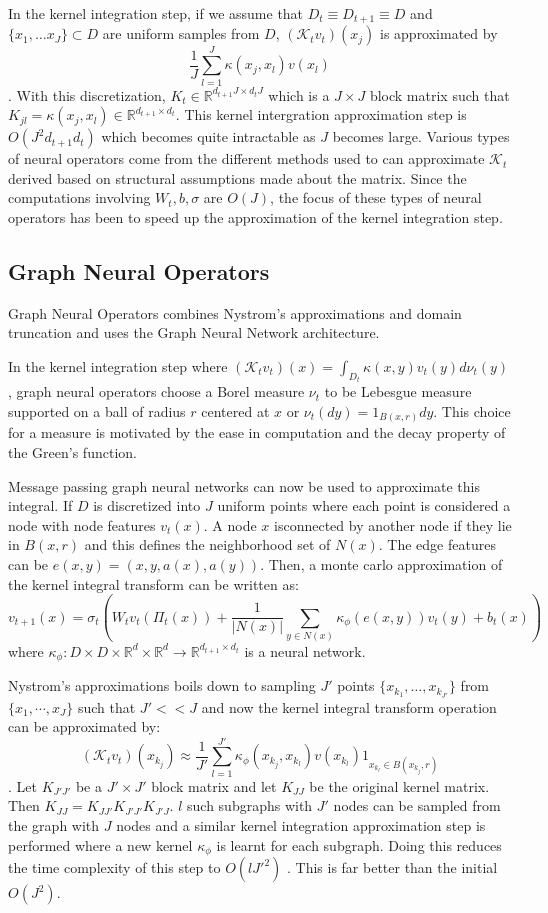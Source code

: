 \documentclass[12pt]{article}
\begin{document}
In the kernel integration step, if we assume that $ D_t \equiv D_{t + 1} \equiv D$ and $\{x_1, \dots x_J\} \subset D$ are uniform samples from $D$, $(\mathcal{K}_tv_t)(x_j)$ is approximated by
$$\frac{1}{J}\sum_{l = 1}^J \kappa(x_j, x_l)v(x_l)$$. With this discretization, $K_t \in \mathbb{R}^{d_{t + 1}J \times d_{t}J}$ which is a $J \times J$ block matrix such that $K_{jl} = \kappa(x_j, x_l) \in \mathbb{R}^{d_{t + 1} \times d_t}$. This kernel intergration approximation step is $O(J^2d_{t + 1}d_t)$ which becomes quite intractable as $J$ becomes large. Various types of neural operators come from the different methods used to can approximate $\mathcal{K}_t$ derived based on structural assumptions made about the matrix. Since the computations involving $W_t, b, \sigma$ are $O(J)$, the focus of these types of neural operators has been to speed up the approximation of the kernel integration step. 


\subsection{Graph Neural Operators}

Graph Neural Operators combines Nystrom's approximations and domain truncation and uses the Graph Neural Network architecture.

In the kernel integration step where $(\mathcal{K}_tv_t)(x) = \int_{D_t}\kappa(x, y)v_t(y)d\nu_t(y)$, graph neural operators choose a Borel measure $\nu_t$ to be  Lebesgue measure supported on a ball of radius $r$ centered at $x$ or $\nu_t(dy) = 1_{B(x, r)}dy$. This choice for a measure is motivated by the ease in computation and the decay property of the Green's function.

Message passing graph neural networks can now be used to approximate this integral. If $D$ is discretized into $J$ uniform points where each point is considered a node with node features $v_t(x)$. A node $x$ isconnected by another node if they lie in $B(x, r)$ and this defines the neighborhood set of $N(x)$. The edge features can be $e(x, y) = (x, y, a(x), a(y))$. Then, a monte carlo approximation of the kernel integral transform can be written as:
$$v_{t + 1}(x) = \sigma_t\left(W_tv_t(\Pi_t(x)) + \frac{1}{|N(x)|}\sum_{y \in N(x)} \kappa_{\phi}(e(x, y))v_t(y) + b_t(x)\right)$$
where $\kappa_{\phi}: D \times D \times \mathbb{R}^d \times \mathbb{R}^d  \to \mathbb{R}^{d_{t + 1} \times d_{t}}$ is a neural network.

Nystrom's approximations boils down to sampling $J'$ points $\{x_{k_1}, \dots, x_{k_{J'}}\}$ from $\{x_1, \cdots, x_{J}\}$ such that $J' << J$ and now the kernel integral transform operation can be approximated by:
$$(\mathcal{K}_t v_t)(x_{k_j}) \approx \frac{1}{J'}\sum_{l = 1}^{J'} \kappa_{\phi}(x_{k_j}, x_{k_l})v(x_{k_l})1_{x_{k_l} \in B(x_{k_j}, r)}$$. Let $K_{J'J'}$ be a $J' \times J'$ block matrix and let $K_{JJ}$ be the original kernel matrix. Then $K_{JJ} = K_{JJ'}K_{J'J'}K_{J'J}$. $l$ such subgraphs with $J'$ nodes can be sampled from the graph with $J$ nodes and a similar kernel integration approximation step is performed where a new kernel $\kappa_{\phi}$ is learnt for each subgraph. Doing this reduces the time complexity of this step to $O(lJ'^2)$ . This is far better than the initial $O(J^2)$. 
\end{document}
